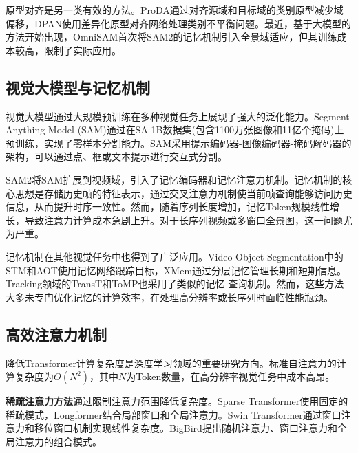原型对齐\cite{zhang2021prototypical,wang2020differential}是另一类有效的方法。ProDA\cite{zhang2021prototypical}通过对齐源域和目标域的类别原型减少域偏移，DPAN\cite{wang2020differential}使用差异化原型对齐网络处理类别不平衡问题。最近，基于大模型的方法开始出现，OmniSAM\cite{zhong2025omnisam}首次将SAM2的记忆机制引入全景域适应，但其训练成本较高，限制了实际应用。

\subsection{视觉大模型与记忆机制}

视觉大模型通过大规模预训练在多种视觉任务上展现了强大的泛化能力。Segment Anything Model (SAM)\cite{kirillov2023segment}通过在SA-1B数据集(包含1100万张图像和11亿个掩码)上预训练，实现了零样本分割能力。SAM采用提示编码器-图像编码器-掩码解码器的架构，可以通过点、框或文本提示进行交互式分割\cite{kirillov2023segment}。

SAM2\cite{ravi2024sam2}将SAM扩展到视频域，引入了记忆编码器和记忆注意力机制。记忆机制的核心思想是存储历史帧的特征表示，通过交叉注意力机制使当前帧查询能够访问历史信息，从而提升时序一致性\cite{ravi2024sam2}。然而，随着序列长度增加，记忆Token规模线性增长，导致注意力计算成本急剧上升。对于长序列视频或多窗口全景图，这一问题尤为严重。

记忆机制在其他视觉任务中也得到了广泛应用。Video Object Segmentation中的STM\cite{oh2019video}和AOT\cite{yang2021associating}使用记忆网络跟踪目标，XMem\cite{cheng2022xmem}通过分层记忆管理长期和短期信息。Tracking领域的TransT\cite{chen2021transformer}和ToMP\cite{mayer2022transforming}也采用了类似的记忆-查询机制。然而，这些方法大多未专门优化记忆的计算效率，在处理高分辨率或长序列时面临性能瓶颈\cite{cheng2022xmem,yang2021associating}。

\subsection{高效注意力机制}

降低Transformer计算复杂度是深度学习领域的重要研究方向。标准自注意力的计算复杂度为$O(N^2)$，其中$N$为Token数量，在高分辨率视觉任务中成本高昂\cite{vaswani2017attention}。

\textbf{稀疏注意力方法}\cite{child2019generating,beltagy2020longformer}通过限制注意力范围降低复杂度。Sparse Transformer\cite{child2019generating}使用固定的稀疏模式，Longformer\cite{beltagy2020longformer}结合局部窗口和全局注意力。Swin Transformer\cite{liu2021swin}通过窗口注意力和移位窗口机制实现线性复杂度。BigBird\cite{zaheer2020big}提出随机注意力、窗口注意力和全局注意力的组合模式。


